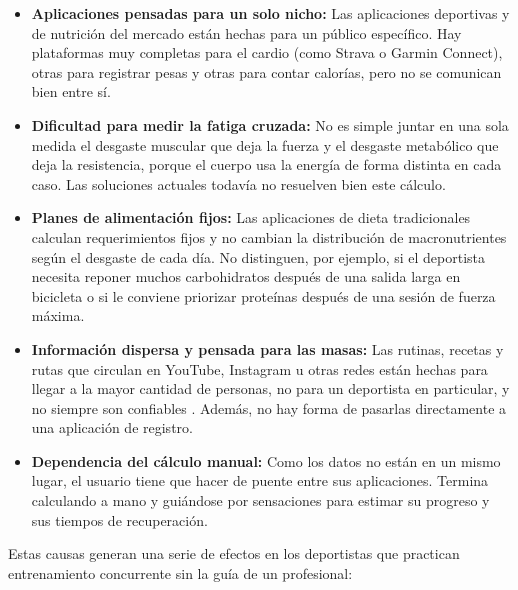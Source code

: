 \begin{itemize} 
    \item \textbf{Aplicaciones pensadas para un solo nicho:} Las aplicaciones deportivas y de nutrición del mercado están hechas para un público específico. Hay plataformas muy completas para el cardio (como Strava o Garmin Connect), otras para registrar pesas y otras para contar calorías, pero no se comunican bien entre sí.


\item \textbf{Dificultad para medir la fatiga cruzada:} No es simple juntar en una sola medida el desgaste muscular que deja la fuerza y el desgaste metabólico que deja la resistencia, porque el cuerpo usa la energía de forma distinta en cada caso. Las soluciones actuales todavía no resuelven bien este cálculo.

  \item \textbf{Planes de alimentación fijos:} Las aplicaciones de dieta tradicionales calculan requerimientos fijos y no cambian la distribución de macronutrientes según el desgaste de cada día. No distinguen, por ejemplo, si el deportista necesita reponer muchos carbohidratos después de una salida larga en bicicleta o si le conviene priorizar proteínas después de una sesión de fuerza máxima.

  \item \textbf{Información dispersa y pensada para las masas:} Las rutinas, recetas y rutas que circulan en YouTube, Instagram u otras redes están hechas para llegar a la mayor cantidad de personas, no para un deportista en particular, y no siempre son confiables \citep{sabbagh2020credibility}. Además, no hay forma de pasarlas directamente a una aplicación de registro.

  \item \textbf{Dependencia del cálculo manual:} Como los datos no están en un mismo lugar, el usuario tiene que hacer de puente entre sus aplicaciones. Termina calculando a mano y guiándose por sensaciones para estimar su progreso y sus tiempos de recuperación.
\end{itemize}
Estas causas generan una serie de efectos en los deportistas que practican entrenamiento concurrente sin la guía de un profesional:


